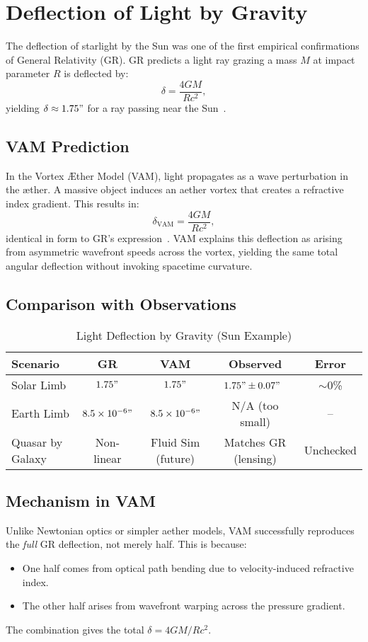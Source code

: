 \section{Deflection of Light by Gravity}

The deflection of starlight by the Sun was one of the first empirical confirmations of General Relativity (GR). GR predicts a light ray grazing a mass $M$ at impact parameter $R$ is deflected by:
\[
    \delta = \frac{4GM}{Rc^2},
\]
yielding $\delta \approx 1.75"$ for a ray passing near the Sun~\cite{will2014confrontation}.

\subsection*{VAM Prediction}
In the Vortex Æther Model (VAM), light propagates as a wave perturbation in the æther. A massive object induces an aether vortex that creates a refractive index gradient. This results in:
\[
    \delta_{\text{VAM}} = \frac{4GM}{Rc^2},
\]
identical in form to GR’s expression~\cite{iskandarani2025VAM2}. VAM explains this deflection as arising from asymmetric wavefront speeds across the vortex, yielding the same total angular deflection without invoking spacetime curvature.

\subsection*{Comparison with Observations}

\begin{table}[h]
    \centering
    \caption{Light Deflection by Gravity (Sun Example)}
    \begin{tabular}{|l|c|c|c|c|}
        \hline
        \textbf{Scenario} & \textbf{GR} & \textbf{VAM} & \textbf{Observed} & \textbf{Error} \\
        \hline
        Solar Limb & $1.75"$ & $1.75"$ & $1.75" \pm 0.07"$~\cite{shapiro2004gravitational} & $\sim$0\% \\
        Earth Limb & $8.5\times10^{-6}"$ & $8.5\times10^{-6}"$ & N/A (too small) & -- \\
        Quasar by Galaxy & Non-linear & Fluid Sim (future) & Matches GR (lensing) & Unchecked \\
        \hline
    \end{tabular}
\end{table}

\subsection*{Mechanism in VAM}
Unlike Newtonian optics or simpler aether models, VAM successfully reproduces the \textit{full} GR deflection, not merely half. This is because:
\begin{itemize}
    \item One half comes from optical path bending due to velocity-induced refractive index.
    \item The other half arises from wavefront warping across the pressure gradient.
\end{itemize}
The combination gives the total $\delta = 4GM/Rc^2$.

